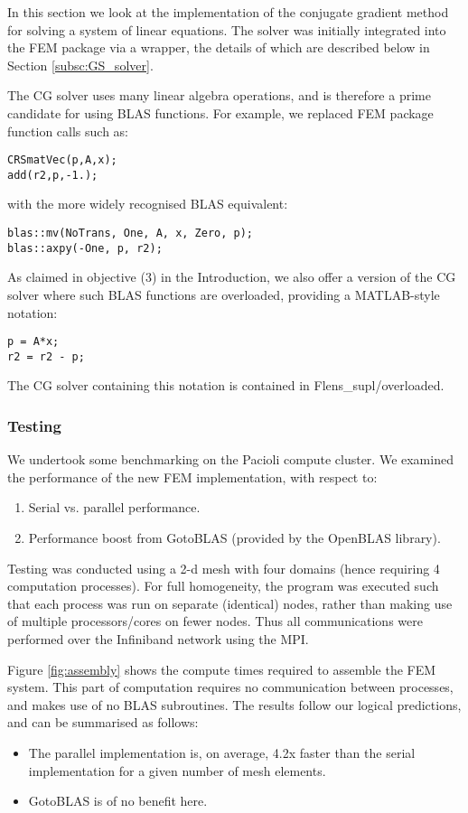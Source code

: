 In this section we look at the implementation of the conjugate gradient method for solving a system of linear equations. The solver was initially integrated into the FEM package via a wrapper, the details of which are described below in Section \ref{subsc:GS_solver}.

The CG solver uses many linear algebra operations, and is therefore a prime candidate for using BLAS functions. For example, we replaced FEM package function calls such as:
\begin{lstlisting}
CRSmatVec(p,A,x);
add(r2,p,-1.);
\end{lstlisting}
with the more widely recognised BLAS equivalent:
\begin{lstlisting}
blas::mv(NoTrans, One, A, x, Zero, p);
blas::axpy(-One, p, r2);
\end{lstlisting}

As claimed in objective (3) in the Introduction, we also offer a version of the CG solver where such BLAS functions are overloaded, providing a MATLAB-style notation:
\begin{lstlisting}
p = A*x;
r2 = r2 - p;
\end{lstlisting}

The CG solver containing this notation is contained in Flens\_supl/overloaded.

\subsubsection{Testing}


We undertook some benchmarking on the Pacioli compute cluster. We examined the performance of the new FEM implementation, with respect to:
\begin{enumerate}
   \item Serial vs. parallel performance.
   \item Performance boost from GotoBLAS (provided by the OpenBLAS library).
\end{enumerate}

Testing was conducted using a 2-d mesh with four domains (hence requiring 4 computation processes). For full homogeneity, the program was executed such that each process was run on separate (identical) nodes, rather than making use of multiple processors/cores on fewer nodes. Thus all communications were performed over the Infiniband network using the MPI. 

Figure \ref{fig:assembly} shows the compute times required to assemble the FEM system. This part of computation requires no communication between processes, and makes use of no BLAS subroutines. The results follow our logical predictions, and can be summarised as follows:
\begin{itemize}
   \item The parallel implementation is, on average, 4.2x faster than the serial implementation for a given number of mesh elements.
   \item GotoBLAS is of no benefit here.
\end{itemize}

